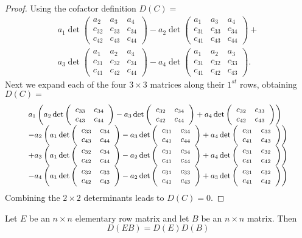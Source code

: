 \documentclass{ximera}
\begin{document}
\begin{proof}
Using the cofactor definition $D(C) = $
\[
\begin{array}{c}
a_1 \det\left(\begin{array}{ccc} a_2 & a_3 & a_4
\\ c_{32} & c_{33} & c_{34} \\ c_{42} & c_{43} & c_{44}
\end{array}\right) 
-a_2\det\left(\begin{array}{ccc} a_1 & a_3 & a_4
\\ c_{31} & c_{33} & c_{34} \\ c_{41} & c_{43} & c_{44}
\end{array}\right) + \\ 
a_3\det\left(\begin{array}{ccc} a_1 & a_2 & a_4
\\ c_{31} & c_{32} & c_{34} \\ c_{41} & c_{42} & c_{44}
\end{array}\right) 
-a_4\det\left(\begin{array}{ccc} a_1 & a_2 & a_3
\\ c_{31} & c_{32} & c_{33} \\ c_{41} & c_{42} & c_{43}
\end{array}\right).
\end{array}
\]
Next we expand each of the four $3\times 3$ matrices along their
$1^{st}$ rows, obtaining $D(C)=$
\[
\small
\begin{array}{l}
a_1\left(a_2\det\left(\begin{array}{rr} c_{33} & c_{34}\\ c_{43} &c_{44}\end{array}\right)
-a_3\det\left(\begin{array}{rr} c_{32} & c_{34}\\ c_{42} &c_{44}\end{array}\right)
+a_4\det\left(\begin{array}{rr} c_{32} & c_{33}\\ c_{42} &c_{43}\end{array}\right)\right)\\ 
-a_2\left(a_1\det\left(\begin{array}{rr} c_{33} & c_{34}\\ c_{43} &c_{44}\end{array}\right)
-a_3\det\left(\begin{array}{rr} c_{31} & c_{34}\\ c_{41} &c_{44}\end{array}\right)
+a_4\det\left(\begin{array}{rr} c_{31} & c_{33}\\ c_{41} &c_{43}\end{array}\right)\right)\\ 
+a_3\left(a_1\det\left(\begin{array}{rr} c_{32} & c_{34}\\ c_{42} &c_{44}\end{array}\right)
-a_2\det\left(\begin{array}{rr} c_{31} & c_{34}\\ c_{41} &c_{44}\end{array}\right)
+a_4\det\left(\begin{array}{rr} c_{31} & c_{32}\\ c_{41} &c_{42}\end{array}\right)\right)\\ 
-a_4\left(a_1\det\left(\begin{array}{rr} c_{32} & c_{33}\\ c_{42} &c_{43}\end{array}\right)
-a_2\det\left(\begin{array}{rr} c_{31} & c_{33}\\ c_{41} &c_{43}\end{array}\right)
+a_3\det\left(\begin{array}{rr} c_{31} & c_{32}\\ c_{41} &c_{42}\end{array}\right)\right)
\end{array}
\]
Combining the $2\times 2$ determinants leads to $D(C)=0$.
\end{proof}

\begin{lemma} \label{L:EB}
Let $E$ be an $n\times n$ elementary row matrix and let $B$ be an $n\times
n$ matrix.   Then
\begin{equation} \label{e:proddetE}
D(EB) = D(E) D(B)
\end{equation} 
\end{lemma}
\end{document}
